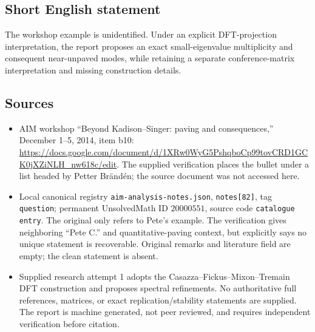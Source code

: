 \documentclass[11pt]{article}
\begin{document}
\subsection{Short English statement}
The workshop example is unidentified. Under an explicit DFT-projection interpretation, the report proposes an exact small-eigenvalue multiplicity and consequent near-unpaved modes, while retaining a separate conference-matrix interpretation and missing construction details.
\subsection{Sources}
\begin{itemize}
\item AIM workshop ``Beyond Kadison--Singer: paving and consequences,'' December 1--5, 2014, item b10: \url{https://docs.google.com/document/d/1XRw0WyG5PshqboCp99tovCRD1GCK0jXZiNLH_nw618c/edit}. The supplied verification places the bullet under a list headed by Petter Br\"and\'en; the source document was not accessed here.
\item Local canonical registry \texttt{aim-analysis-notes.json}, \texttt{notes[82]}, tag \texttt{question}; permanent UnsolvedMath ID \(20000551\), source code \texttt{catalogue entry}. The original only refers to Pete's example. The verification gives neighboring ``Pete C.'' and quantitative-paving context, but explicitly says no unique statement is recoverable. Original remarks and literature field are empty; the clean statement is absent.
\item Supplied research attempt 1 adopts the Casazza--Fickus--Mixon--Tremain DFT construction and proposes spectral refinements. No authoritative full references, matrices, or exact replication/stability statements are supplied. The report is machine generated, not peer reviewed, and requires independent verification before citation.
\end{itemize}
\end{document}
